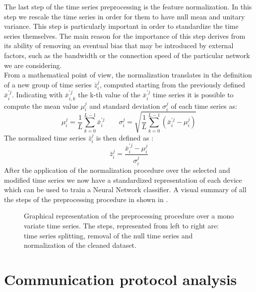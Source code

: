 The last step of the time series preprocessing is the feature normalization. In this step we rescale the time series in order for them to have null mean and unitary variance. This step is particularly important in order to standardize the time series themselves. The main reason for the importance of this step derives from its ability of removing an eventual bias that may be introduced by external factors, such as the bandwidth or the connection speed of the particular network we are considering. \\
From a mathematical point of view, the normalization translates in the definition of a new group of time series $\bar{z}^{j}_i$, computed starting from the previously defined $\bar{x}^{\prime j}_i$. Indicating with $\bar{x}^{\prime j}_{i,k}$ the k-th value of the $\bar{x}^{\prime j}_i$ time series it is possible to compute the mean value $\mu_i^j$ and standard deviation $\sigma_i^j$ of each time series as:
\begin{equation}
\mu_i^j = \frac{1}{L}\sum_{k=0}^{L-1} \bar{x}^{\prime j}_i\qquad
    \sigma_i^j = \sqrt{\frac{1}{L}\sum_{k=0}^{L-1}
                \left(\bar{x}^{\prime j}_i-\mu_i^j\right)}
\end{equation}
The normalized time series $\bar{z}^{j}_i$ is then defined as :
\begin{equation}
    \bar{z}^{j}_i = \frac{\bar{x}^{\prime j}_i - \mu_i^j}{\sigma_i^j}
\end{equation}
After the application of the normalization procedure over the selected and modified time series we now have a standardized representation of each device which can be used to train a Neural Network classifier. A visual summary of all the steps of the preprocessing procedure in shown in .



\begin{figure}
    \centering

%
\caption{Graphical representation of the preprocessing procedure over a mono variate time series. The steps, represented from left to right are: time series splitting, removal of the null time series and normalization of the cleaned dataset.}
    \label{fig:ts_processing}
\end{figure}

\section{Communication protocol analysis}

